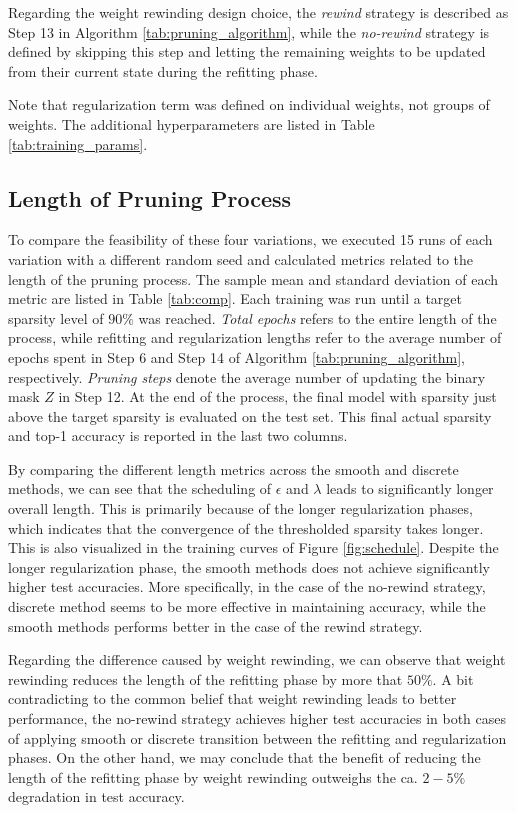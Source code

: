 Regarding the weight rewinding design choice, the \textit{rewind} strategy is described as Step 13 in Algorithm \ref{tab:pruning_algorithm},
while the \textit{no-rewind} strategy is defined by skipping this step and letting the remaining weights to be updated from their current state during the refitting phase.

Note that regularization term was defined on individual weights, not groups of weights.
The additional hyperparameters are listed in Table \ref{tab:training_params}.

\subsection{Length of Pruning Process}

To compare the feasibility of these four variations, we executed 15 runs of each variation with a different random seed and calculated metrics
related to the length of the pruning process. The sample mean and standard deviation of each metric are listed in Table \ref{tab:comp}. Each training
was run until a target sparsity level of $90\%$ was reached. \textit{Total epochs} refers to the entire length of the process, while refitting and regularization lengths refer to the
average number of epochs spent in Step 6 and Step 14 of Algorithm \ref{tab:pruning_algorithm}, respectively. \textit{Pruning steps} denote the average number of updating 
the binary mask $Z$ in Step 12. At the end of the process, the final model with sparsity just above the target sparsity is evaluated on the test set. This final actual sparsity and
top-1 accuracy is reported in the last two columns. 



By comparing the different length metrics across the smooth and discrete methods, we can see that the scheduling 
of $\epsilon$ and $\lambda$ leads to significantly longer overall length. This is primarily because of the longer regularization phases, which indicates that the convergence of
the thresholded sparsity takes longer. This is also visualized in the training curves of Figure \ref{fig:schedule}. Despite the longer regularization phase, the smooth methods
does not achieve significantly higher test accuracies. More specifically, in the case of the no-rewind strategy, discrete method seems to be more effective in 
maintaining accuracy, while the smooth methods performs better in the case of the rewind strategy.


Regarding the difference caused by weight rewinding, we can observe that weight rewinding reduces the length of the refitting phase by more that $50\%$. 
A bit contradicting to the common belief that weight rewinding leads to better performance, the no-rewind strategy achieves higher test accuracies in both cases of applying smooth 
or discrete transition between the refitting and regularization phases. On the other hand, we may conclude that the benefit of reducing the length of
the refitting phase by weight rewinding outweighs the ca. $2-5\%$ degradation in test accuracy.

